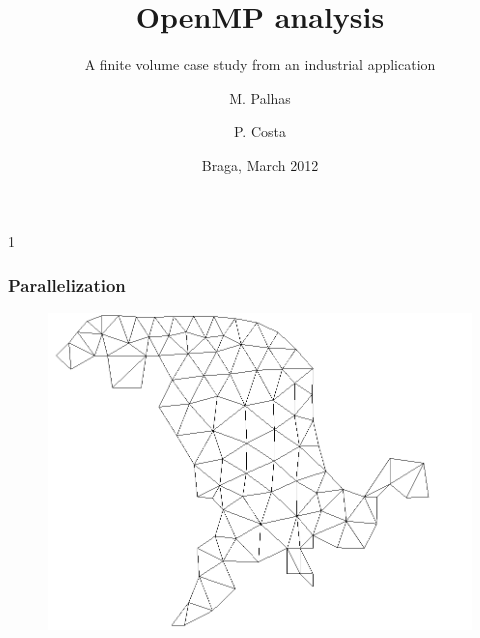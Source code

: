 1\documentclass{beamer}
\title{OpenMP analysis}
\subtitle{A finite volume case study from an industrial application}
\author{M. Palhas \and P. Costa}
\institute[19808 \and 19830]{
	University of Minho\\
	Department of Informatics
}
\date{Braga, March 2012}
\begin{document}

\maketitle%


\begin{frame}
	\frametitle{Parallelization}
	\begin{figure}
		\begin{center}
			\includegraphics[height=0.8\textheight]{images/slides.march/mesh0.png}
		\end{center}
	\end{figure}
\end{frame}
\end{document}
